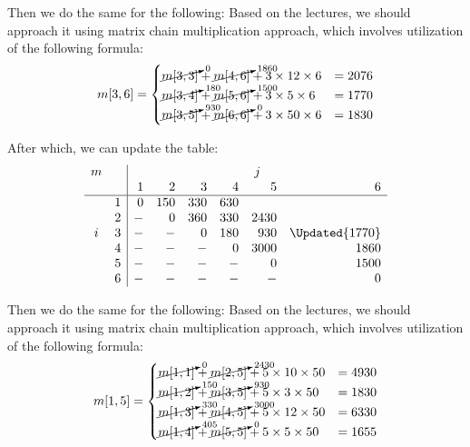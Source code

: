 Then we do the same for the following:
Based on the lectures, we should approach it using matrix chain multiplication
approach, which involves utilization of the following formula:
$$
    m[3, 6] =
    \begin{cases}
        \cancelto{0}{m[3, 3]}   + \cancelto{1860}{m[4, 6]} + 3 \times 12 \times 6  & = 2076  \\
        \cancelto{180}{m[3, 4]} + \cancelto{1500}{m[5, 6]} + 3 \times  5 \times 6  & = 1770  \\
        \cancelto{930}{m[3, 5]} + \cancelto{0}{m[6, 6]}    + 3 \times 50 \times 6  & = 1830
    \end{cases}
$$

After which, we can update the table:
\[
\begin{array}{cc|rrrrrr}
m &   & \multicolumn{6}{c}{j}                          \\
  &   &  1   &  2  &  3  &  4  &   5  &        6       \\
\hline
  & 1 &  0   & 150 & 330 & 630 &      &                \\
  & 2 &  -   &  0  & 360 & 330 & 2430 &                \\
i & 3 &  -   &  -  &  0  & 180 &  930 & \Updated{1770} \\
  & 4 &  -   &  -  &  -  &  0  & 3000 &      1860      \\
  & 5 &  -   &  -  &  -  &  -  &   0  &      1500      \\
  & 6 &  -   &  -  &  -  &  -  &   -  &        0
\end{array}
\]


Then we do the same for the following:
Based on the lectures, we should approach it using matrix chain multiplication
approach, which involves utilization of the following formula:
$$
    m[1, 5] =
    \begin{cases}
        \cancelto{0}{m[1, 1]}   + \cancelto{2430}{m[2, 5]} + 5 \times 10 \times 50  & = 4930 \\
        \cancelto{150}{m[1, 2]} + \cancelto{930}{m[3, 5]}  + 5 \times  3 \times 50  & = 1830 \\
        \cancelto{330}{m[1, 3]} + \cancelto{3000}{m[4, 5]} + 5 \times 12 \times 50  & = 6330 \\
        \cancelto{405}{m[1, 4]} + \cancelto{0}{m[5, 5]}    + 5 \times  5 \times 50  & = 1655
    \end{cases}
$$

